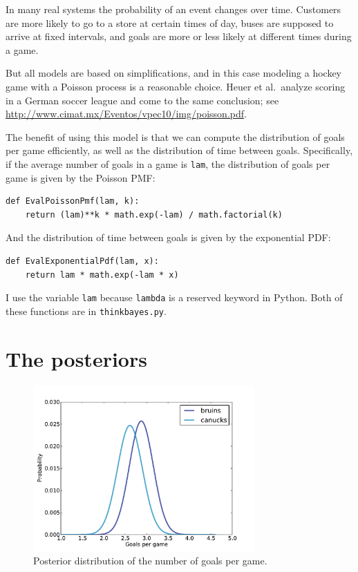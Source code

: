 \documentclass[12pt]{book}
\begin{document}
In many real systems the probability of an event changes over time.
Customers are more likely to go to a store at certain times of day,
buses are supposed to arrive at fixed intervals, and goals are more
or less likely at different times during a game.

But all models are based on simplifications, and in this case modeling
a hockey game with a Poisson process is a reasonable choice.  Heuer
et al.~analyze scoring in a German soccer league and come to the same
conclusion; see
\url{http://www.cimat.mx/Eventos/vpec10/img/poisson.pdf}.

The benefit of using this model is that we can compute the distribution
of goals per game efficiently, as well as the distribution of time
between goals.  Specifically, if the average number of goals
in a game is {\tt lam}, the distribution of goals per game is
given by the Poisson PMF:

\begin{verbatim}
def EvalPoissonPmf(lam, k):
    return (lam)**k * math.exp(-lam) / math.factorial(k)
\end{verbatim}  

And the distribution of time between goals is given by the
exponential PDF:

\begin{verbatim}
def EvalExponentialPdf(lam, x):
    return lam * math.exp(-lam * x)
\end{verbatim}  

I use the variable
{\tt lam} because {\tt lambda} is a reserved keyword in Python.
Both of these functions are in \verb"thinkbayes.py".


\section{The posteriors}

\begin{figure}
\centerline{\includegraphics[height=2.5in]{figs/hockey1.pdf}}
\caption{Posterior distribution of the number of
goals per game.}
\label{fig.hockey1}
\end{figure}
\end{document}
